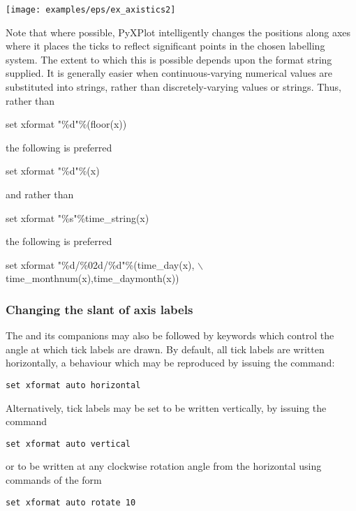 \noindent\centerline{\texttt{[image: examples/eps/ex\_axistics2]}}

Note that where possible, PyXPlot intelligently changes the positions along
axes where it places the ticks to reflect significant points in the chosen
labelling system.  The extent to which this is possible depends upon the format
string supplied. It is generally easier when continuous-varying numerical
values are substituted into strings, rather than discretely-varying values or
strings. Thus, rather than

\begin{dontdo}
set xformat "\%d"\%(floor(x))
\end{dontdo}

\noindent the following is preferred

\begin{dodo}
set xformat "\%d"\%(x)
\end{dodo}

\noindent and rather than

\begin{dontdo}
set xformat "\%s"\%time\_string(x)
\end{dontdo}

\noindent the following is preferred

\begin{dodo}
set xformat "\%d/\%02d/\%d"\%(time\_day(x), $\backslash$\newline time\_monthnum(x),time\_daymonth(x))
\end{dodo}

\subsubsection{Changing the slant of axis labels}

The  and its companions may also be followed by keywords
which control the angle at which tick labels are drawn. By default, all tick
labels are written horizontally, a behaviour which may be reproduced by issuing
the command:
\begin{verbatim}
set xformat auto horizontal
\end{verbatim}
Alternatively, tick labels may be set to be written vertically, by issuing the command
\begin{verbatim}
set xformat auto vertical
\end{verbatim}
or to be written at any clockwise rotation angle from the horizontal using commands of the form
\begin{verbatim}
set xformat auto rotate 10
\end{verbatim}

